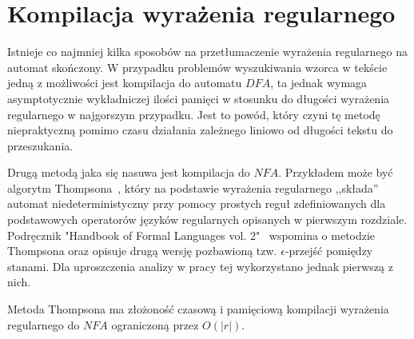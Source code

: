 \section{Kompilacja wyrażenia regularnego}
\par
Istnieje co najmniej kilka sposobów na przetłumaczenie wyrażenia regularnego na automat skończony. W przypadku problemów
wyszukiwania wzorca w tekście jedną z możliwości jest kompilacja do automatu $DFA$, ta jednak wymaga asymptotycznie
wykładniczej ilości pamięci w stosunku do długości wyrażenia regularnego w najgorszym przypadku. Jest to powód, który
czyni tę metodę niepraktyczną pomimo czasu działania zależnego liniowo od długości tekstu do przeszukania.
\par
Drugą metodą jaka się nasuwa jest kompilacja do $NFA$. Przykładem może być algorytm Thompsona~\cite{Thompson}, który na podstawie wyrażenia
regularnego ,,składa'' automat niedeterministyczny przy pomocy prostych reguł zdefiniowanych dla podstawowych
operatorów języków regularnych opisanych w pierwszym rozdziale. Podręcznik "Handbook of Formal Languages vol. 2"~\cite{FormalLanguages2}
wspomina o metodzie Thompsona oraz opisuje drugą wersję pozbawioną tzw. $\epsilon$-przejść pomiędzy stanami. Dla uproszczenia analizy
w pracy tej wykorzystano jednak pierwszą z nich.
\begin{theorem}
Metoda Thompsona ma złożoność czasową i pamięciową kompilacji wyrażenia regularnego do $NFA$ ograniczoną przez $O(|r|)$.
\end{theorem}
